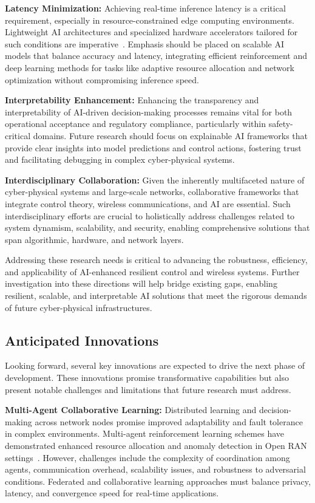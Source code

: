 \documentclass[sigconf]{acmart}
\begin{document}
\textbf{Latency Minimization:} Achieving real-time inference latency is a critical requirement, especially in resource-constrained edge computing environments. Lightweight AI architectures and specialized hardware accelerators tailored for such conditions are imperative~\cite{ref50}. Emphasis should be placed on scalable AI models that balance accuracy and latency, integrating efficient reinforcement and deep learning methods for tasks like adaptive resource allocation and network optimization without compromising inference speed.

\textbf{Interpretability Enhancement:} Enhancing the transparency and interpretability of AI-driven decision-making processes remains vital for both operational acceptance and regulatory compliance, particularly within safety-critical domains. Future research should focus on explainable AI frameworks that provide clear insights into model predictions and control actions, fostering trust and facilitating debugging in complex cyber-physical systems.

\textbf{Interdisciplinary Collaboration:} Given the inherently multifaceted nature of cyber-physical systems and large-scale networks, collaborative frameworks that integrate control theory, wireless communications, and AI are essential. Such interdisciplinary efforts are crucial to holistically address challenges related to system dynamism, scalability, and security, enabling comprehensive solutions that span algorithmic, hardware, and network layers.

Addressing these research needs is critical to advancing the robustness, efficiency, and applicability of AI-enhanced resilient control and wireless systems. Further investigation into these directions will help bridge existing gaps, enabling resilient, scalable, and interpretable AI solutions that meet the rigorous demands of future cyber-physical infrastructures.

\subsection{Anticipated Innovations}

Looking forward, several key innovations are expected to drive the next phase of development. These innovations promise transformative capabilities but also present notable challenges and limitations that future research must address.

\textbf{Multi-Agent Collaborative Learning:} Distributed learning and decision-making across network nodes promise improved adaptability and fault tolerance in complex environments. Multi-agent reinforcement learning schemes have demonstrated enhanced resource allocation and anomaly detection in Open RAN settings~\cite{ref49}. However, challenges include the complexity of coordination among agents, communication overhead, scalability issues, and robustness to adversarial conditions. Federated and collaborative learning approaches must balance privacy, latency, and convergence speed for real-time applications.
\end{document}
